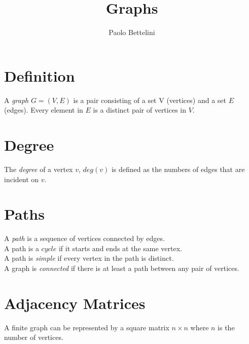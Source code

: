 \documentclass{article}
\title{Graphs}
\author{Paolo Bettelini}
\date{}
\begin{document}
\maketitle
\tableofcontents
\pagebreak

\section{Definition}

A \textit{graph} \(G=(V,E)\) is a pair consisting of a set V (vertices)
and a set \(E\) (edges). Every element in \(E\) is a distinct pair of vertices
in \(V\).

\section{Degree}

The \textit{degree} of a vertex \(v\), \(deg(v)\) is defined
as the numbers of edges that are incident on \(v\).

\section{Paths}

A \textit{path} is a sequence of vertices connected by edges.
\\A path is a \(cycle\) if it starts and ends at the same vertex.
\\A path is \textit{simple} if every vertex in the path is distinct.
\\A graph is \textit{connected} if there is at least a path
between any pair of vertices.

\section{Adjacency Matrices}

A finite graph can be represented by a square matrix
\(n \times n\) where \(n\) is the number of vertices.
\end{document}
